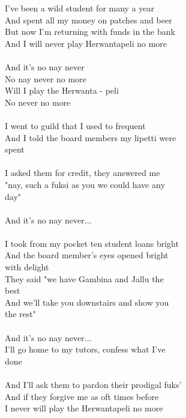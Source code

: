 
I've been a wild student for many a year \\ And spent all my money on patches and beer \\ But now I'm returning with funds in the bank \\ And I will never play Herwantapeli no more \\ \hspace{10mm} \\ And it's no nay never \\ No nay never no more \\ Will I play the Herwanta - peli \\ No never no more \\ \hspace{10mm} \\ I went to guild that I used to frequent \\ And I told the board members my lipetti were \\ spent \\ \hspace{10mm} \\ I asked them for credit, they answered me \\ "nay, such a fuksi as you we could have any \\ day" \\ \hspace{10mm} \\ And it's no nay never... \\ \hspace{10mm} \\ I took from my pocket ten student loans bright \\ And the board member's eyes opened bright \\ with delight \\ They said "we have Gambina and Jallu the \\ best \\ And we'll take you downstairs and show you \\ the rest" \\ \hspace{10mm} \\ And it's no nay never... \\ I'll go home to my tutors, confess what I've \\ done \\ \hspace{10mm} \\ And I'll ask them to pardon their prodigal fuks' \\ And if they forgive me as oft times before \\ I never will play the Herwantapeli no more